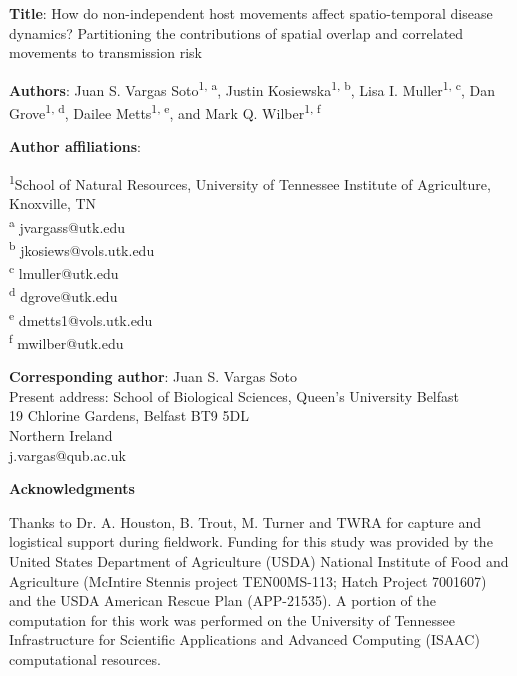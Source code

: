 \documentclass[letterpaper]{article}
\begin{document}
\noindent
\textbf{Title}: How do non-independent host movements affect spatio-temporal disease dynamics? Partitioning the contributions of spatial overlap and correlated movements to transmission risk

\bigskip

\noindent

\bigskip

\noindent
\textbf{Authors}: Juan S. Vargas Soto\textsuperscript{1, a}, Justin Kosiewska\textsuperscript{1, b}, Lisa I. Muller\textsuperscript{1, c}, Dan Grove\textsuperscript{1, d}, Dailee Metts\textsuperscript{1, e}, and Mark Q. Wilber\textsuperscript{1, f}

\bigskip

\noindent
\textbf{Author affiliations}:

\noindent
\textsuperscript{1}School of Natural Resources, University of Tennessee Institute of Agriculture, Knoxville, TN \\
\textsuperscript{a} jvargass@utk.edu\\
\textsuperscript{b} jkosiews@vols.utk.edu\\
\textsuperscript{c} lmuller@utk.edu\\
\textsuperscript{d} dgrove@utk.edu\\
\textsuperscript{e} dmetts1@vols.utk.edu\\
\textsuperscript{f} mwilber@utk.edu

\bigskip

\noindent
\textbf{Corresponding author}: Juan S. Vargas Soto\\
Present address: School of Biological Sciences, Queen's University Belfast\\
19 Chlorine Gardens, Belfast BT9 5DL\\
Northern Ireland\\
j.vargas@qub.ac.uk
\bigskip

\noindent
\textbf{Acknowledgments}

Thanks to Dr. A. Houston, B. Trout, M. Turner and TWRA for capture and logistical support during fieldwork. Funding for this study was provided by the United States Department of Agriculture (USDA) National Institute of Food and Agriculture (McIntire Stennis project TEN00MS-113; Hatch Project 7001607) and the USDA American Rescue Plan (APP-21535). A portion of the computation for this work was performed on the University of Tennessee Infrastructure for Scientific Applications and Advanced Computing (ISAAC) computational resources.
\bigskip
\end{document}
